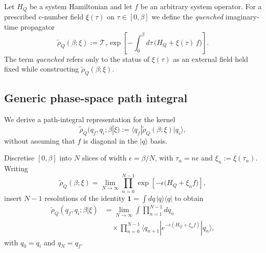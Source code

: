 Let $H_Q$ be a system Hamiltonian and let $f$ be an arbitrary system operator.
For a prescribed c-number field $\xi(\tau)$ on $\tau\in[0,\beta]$ we define the
\emph{quenched} imaginary-time propagator
\begin{equation}
    \tilde\rho_Q(\beta;\xi)
    :=
    \mathcal T_\tau
    \exp\!\left[
        -\int_0^\beta d\tau\,
        \big(H_Q+\xi(\tau)\,f\big)
    \right].
    \label{eq:quenched_operator_def}
\end{equation}
The term \emph{quenched} refers only to the status of $\xi(\tau)$ as an external
field held fixed while constructing $\tilde\rho_Q(\beta;\xi)$.

\subsection{Generic phase-space path integral}

We derive a path-integral representation for the kernel
\begin{equation}
    \tilde\rho_Q(q_f,q_i;\beta|\xi)
    := \langle q_f|\tilde\rho_Q(\beta;\xi)|q_i\rangle,
\end{equation}
without assuming that $f$ is diagonal in the $|q\rangle$ basis.

Discretise $[0,\beta]$ into $N$ slices of width $\epsilon=\beta/N$, with
$\tau_n=n\epsilon$ and $\xi_n:=\xi(\tau_n)$. Writing
\begin{equation}
    \tilde\rho_Q(\beta;\xi)
    =
    \lim_{N\to\infty}
    \prod_{n=0}^{N-1}
    \exp\!\left[-\epsilon\big(H_Q+\xi_n f\big)\right],
\end{equation}
insert $N-1$ resolutions of the identity $\mathbf 1=\int dq\,|q\rangle\langle q|$ to obtain
\begin{equation}
\begin{split}
    \tilde\rho_Q(q_f,q_i;\beta|\xi)
    &=
    \lim_{N\to\infty}
    \int \prod_{n=1}^{N-1} dq_n \\
    &\quad \times \prod_{n=0}^{N-1}
    \langle q_{n+1}|e^{-\epsilon(H_Q+\xi_n f)}|q_n\rangle,
\end{split}
    \label{eq:quenched_trotter_q}
\end{equation}
with $q_0=q_i$ and $q_N=q_f$.


